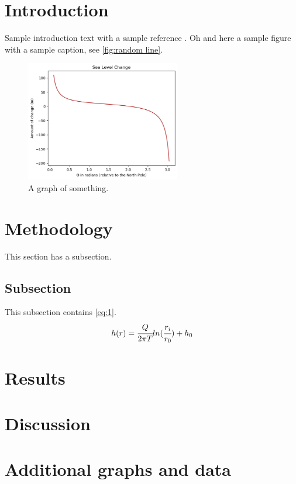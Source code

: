 \documentclass{article}
\begin{document}


\tableofcontents
\newpage

\section*{Introduction}
Sample introduction text with a sample reference \cite{HussFarinotti2014}. Oh and here a sample figure with a sample caption, see \autoref{fig:random line}.

\begin{figure}[H]
\centering
\includegraphics[width=0.6\textwidth]{images/Sample graph.png}
\caption{A graph of something.}
\label{fig:random line}
\end{figure}

\section{Methodology}
This section has a subsection.
\subsection{Subsection}
This subsection contains \autoref{eq:1}.
\begin{equation}
\label{eq:1}
    h(r) = \cfrac{Q}{2\pi T} ln(\cfrac{r_i}{r_0})+h_0
\end{equation}

\section{Results}

\section{Discussion}


\newpage
{}



\newpage
\appendix
\section{Additional graphs and data}
\end{document}
